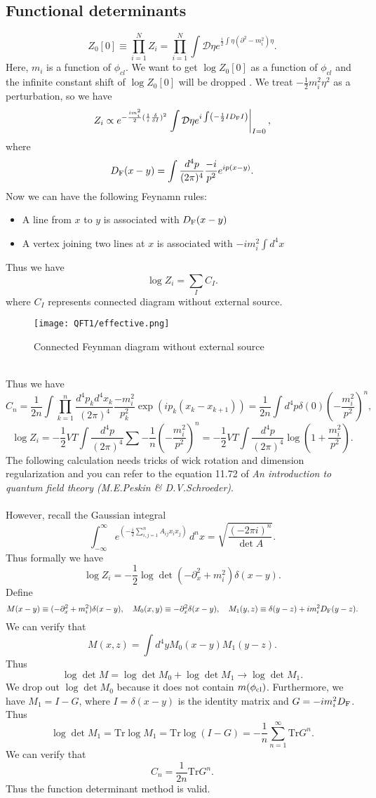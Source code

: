\subsection{Functional determinants}
\[Z_0[0] \equiv \prod_{i=1}^{N} Z_i  = \prod_{i=1}^{N} \int \mathcal{D}\eta e^{ \frac{i}{2}\int \eta \left( \partial^2-m_i^2\right) \eta }.\]
Here, $m_i$ is a function of $\phi_{cl}$. We want to get $\log Z_0[0]$ as a function of $\phi_{cl}$ and the  infinite constant shift of $\log Z_0[0]$ will be dropped . We treat $-\frac{1}{2}m_i^2\eta^2$ as a perturbation, so we have
\[Z_i \propto e^{-\frac{im_i^2}{2}(\frac{1}{i} \frac{\delta}{\delta I})^2} \left. \int \mathcal{D}\eta e^{i\int \left(-\frac{1}{2} I D_{\rm F} I \right)} \right|_{I=0},\] 
where
\[D_{\rm F}(x-y) = \int \frac{d^4p}{(2\pi)^4} \frac{-i}{p^2}e^{ip(x-y)}.\]
Now we can have the following Feynamn rules:
\begin{itemize}
\item A line from $x$ to $y$ is associated with $D_{\rm F}(x-y)$
\item A vertex joining two lines at $x$ is associated with $-im_i^2\int d^4x$
\end{itemize}
Thus we have
\[\log Z_i = \sum_{I}C_I.\]
where $C_I$ represents connected diagram without external source.
\\
\begin{figure}[!h]
\centering
\texttt{[image: QFT1/effective.png]}
\caption{Connected Feynman diagram without external source}
\end{figure}
\\
Thus we have
\[C_n = \frac{1}{2n}\int \prod_{k=1}^{n} \frac{d^4p_k d^4x_k}{(2\pi)^4} \frac{-m_i^2}{p_k^2} \exp(ip_k(x_k-x_{k+1})) = \frac{1}{2n} \int d^4p \delta(0) \left(-\frac{m_i^2}{p^2} \right)^n,\] 
\[\log Z_i = -\frac{1}{2}VT \int \frac{d^4p}{(2\pi)^4} \sum -\frac{1}{n} \left(-\frac{m_i^2}{p^2} \right)^n = -\frac{1}{2}VT\int  \frac{d^4p}{(2\pi)^4} \log(1+\frac{m_i^2}{p^2}).\]
The following calculation needs tricks of wick rotation and dimension regularization and you can refer to the equation 11.72 of \emph{An introduction to quantum field theory (M.E.Peskin \& D.V.Schroeder)}.
\\ \\
However, recall the Gaussian integral
\[\int _{-\infty }^{\infty }e^{\left(-{\frac {i}{2}}\sum \limits _{i,j=1}^{n}A_{ij}x_{i}x_{j}\right)}\,d^{n}x
= {\sqrt {\frac {(-2\pi i)^{n}}{\det A}}} .\]
Thus formally we have
\[\log Z_i = -\frac{1}{2}\log \det (-\partial_x^2 + m_i^2)\delta(x-y).\]
Define
\[M(x-y) \equiv (-\partial_x^2 + m_i^2)\delta(x-y) , \quad M_0(x,y) \equiv -\partial_x^2\delta(x-y) , \quad M_1(y,z) \equiv \delta(y-z) + im_i^2D_{\rm F}(y-z).\]
We can verify that
\[M(x,z) = \int d^4y M_0(x-y)M_1(y-z).\]
Thus
\[\log \det M = \log \det M_0 + \log \det M_1 \to \log \det M_1.\]
We drop out $\log \det M_0$ because it does not contain $m(\phi_{\rm cl})$. Furthermore, we have $M_1 = I - G$, where $I = \delta(x-y)$ is the identity matrix and $G = -im_i^2D_{\rm F}$. Thus
\[\log \det M_1 =  \mathrm{Tr} \log M_1 = \mathrm{Tr} \log(I-G) = -\frac{1}{n}\sum_{n=1}^{\infty} \mathrm{Tr} G^n.\]
We can verify that
\[C_n = \frac{1}{2n} \mathrm{Tr} G^n.\]
Thus the function determinant method is valid.

